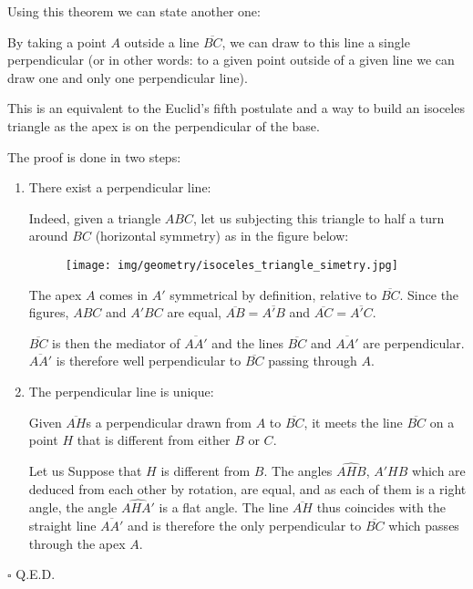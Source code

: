 	Using this theorem we can state another one:
	\begin{theorem}
	By taking a point $A$ outside a line $\overline{BC}$, we can draw to this line a single perpendicular (or in other words: to a given point outside of a given line we can draw one and only one perpendicular line).

	This is an equivalent to the Euclid's fifth postulate and a way to build an isoceles triangle as the apex is on the perpendicular of the base.
	\end{theorem}
	\begin{dem}
	The proof is done in two steps: 
	\begin{enumerate}
		\item There exist a perpendicular line:
		
		Indeed, given a triangle $ABC$, let us subjecting this triangle to half a turn around $BC$ (horizontal symmetry) as in the figure below:
		\begin{figure}[H]
			\centering
			\texttt{[image: img/geometry/isoceles\_triangle\_simetry.jpg]}
		\end{figure}
		The apex $A$ comes in $A'$ symmetrical by definition, relative to $\overline{BC}$. Since the figures, $ABC$ and $A'BC$ are equal, $\overline{AB}=\overline{A'B}$ and $\overline{AC} = \overline{A'C}$. 

		$\overline{BC}$ is then the mediator of $\overline{AA '}$ and the lines $\overline{BC}$ and $\overline{AA'}$ are perpendicular. $\overline{AA'}$ is therefore well perpendicular to $\overline{BC}$ passing through $A$.
		
		\item The perpendicular line is unique:
		
		Given $\overline{AH}$s a perpendicular drawn from $A$ to $\overline{BC}$, it meets the line $\overline{BC}$ on a point $H$ that is different from either $B$ or $C$.

		Let us Suppose that $H$ is different from $B$. The angles $\widehat{AHB}$, $A'HB$ which are deduced from each other by rotation, are equal, and as each of them is a right angle, the angle $\widehat{AHA'}$ is a flat angle. The line $\overline{AH}$ thus coincides with the straight line $\overline{AA'}$ and is therefore the only perpendicular to $\overline{BC}$ which passes through the apex $A$.

	\end{enumerate}
	\begin{flushright}
		$\square$  Q.E.D.
	\end{flushright}
	\end{dem}
